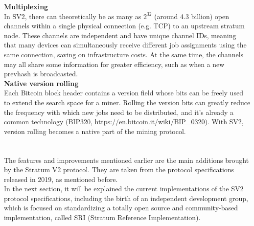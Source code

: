 \noindent\textbf{Multiplexing}\\
In SV2, there can theoretically be as many as $2^{32}$ (around 4.3 billion) open channels within a single physical connection (e.g. TCP) to an upstream stratum node. These channels are independent and have unique channel IDs, meaning that many devices can simultaneously receive different job assignments using the same connection, saving on infrastructure costs. At the same time, the channels may all share some information for greater efficiency, such as when a new prevhash is broadcasted.\\

\noindent\textbf{Native version rolling}\\
Each Bitcoin block header contains a version field whose bits can be freely used to extend the search space for a miner. Rolling the version bits can greatly reduce the frequency with which new jobs need to be distributed, and it's already a common technology (BIP320, \href{https://en.bitcoin.it/wiki/BIP_0320}{https://en.bitcoin.it/wiki/BIP\_0320}). With SV2, version rolling becomes a native part of the mining protocol.\\\\\\


\noindent The features and improvements mentioned earlier are the main additions brought by the Stratum V2 protocol. They are taken from the protocol specifications released in 2019, as mentioned before. \\ 
In the next section, it will be explained the current implementations of the SV2 protocol specifications, including the birth of an independent development group, which is focused on standardizing a totally open source and community-based implementation, called SRI (Stratum Reference Implementation).